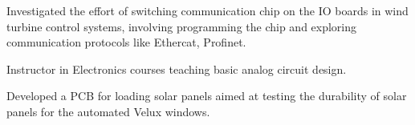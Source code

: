      
\divider

Investigated the effort of switching communication chip on the IO boards in wind turbine control systems, involving programming the chip and exploring communication protocols like Ethercat, Profinet.

  
\divider

Instructor in Electronics courses teaching basic analog circuit design.


\divider

Developed a PCB for loading solar panels aimed at testing the durability of solar panels for the automated Velux windows.

\divider
